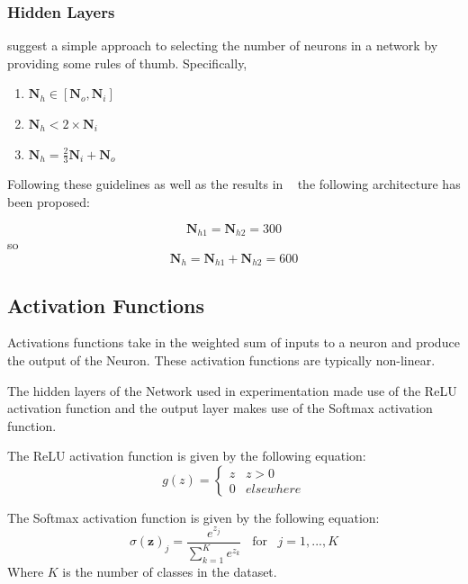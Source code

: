 \documentclass{article}
\begin{document}
\subsubsection{Hidden Layers}

\citet{panchal2014review} suggest a simple approach to selecting the number of neurons in a network by providing some rules of thumb. Specifically,
\begin{enumerate}
	\item	$\boldsymbol{N}_h\in[\boldsymbol{N}_o, \boldsymbol{N}_i]$
	
	\item$\boldsymbol{N}_h < 2\times\boldsymbol{N}_i$
	
	\item$\boldsymbol{N}_h = \frac{2}{3}\boldsymbol{N}_i + \boldsymbol{N}_o$
\end{enumerate}

Following these guidelines as well as the results in ~\cite{deepsimpleMLP} the following architecture has been proposed:

\begin{equation}
\boldsymbol{N}_{h1} = \boldsymbol{N}_{h2} = 300
\end{equation}
so \begin{equation}
\boldsymbol{N}_h = \boldsymbol{N}_{h1} + \boldsymbol{N}_{h2} = 600
\end{equation}



\subsection{Activation Functions}
Activations functions take in the weighted sum of inputs to a neuron and produce the output of the Neuron. These activation functions are typically non-linear.

The hidden layers of the Network used in experimentation made use of the ReLU activation function and the output layer makes use of the Softmax activation function.

The ReLU activation function is given by the following equation:
\begin{equation}
g(z) = \begin{cases} 
z & z > 0 \\
0 & elsewhere
\end{cases}
\end{equation}

The Softmax activation function is given by the following equation:
\begin{equation}
\sigma(\boldsymbol{z})_j = \frac{e^{z_j}}{\sum_{k=1}^{K} e^{z_{k}}} \;\;\; \mbox{for} \;\;\; j = 1, ... , K 
\end{equation}
Where $K$ is the number of classes in the dataset.
\end{document}
